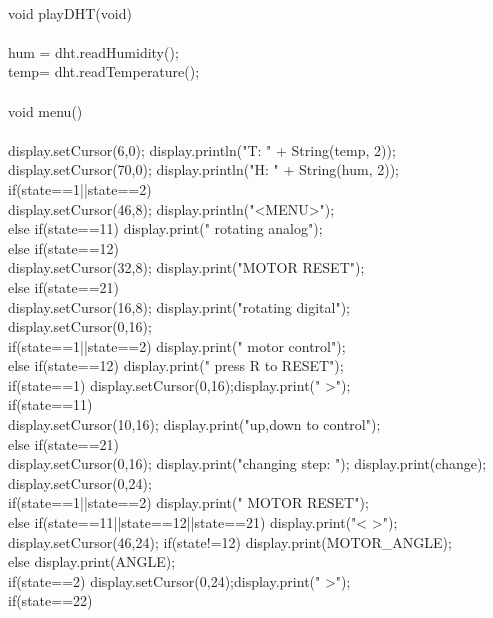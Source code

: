 \begin{verbbox}
{{}\\
void playDHT(void)\\
{\\
	hum = dht.readHumidity();\\
	temp= dht.readTemperature();\\
}\\
void menu()\\
{\\
	display.setCursor(6,0); display.println("T: " + String(temp, 2));\\
	display.setCursor(70,0); display.println("H: " + String(hum, 2));\\
	if(state==1||state==2) \\
	{display.setCursor(46,8); display.println("<MENU>");}\\
	else if(state==11) display.print("   rotating analog");\\
	else if(state==12)\\
	{display.setCursor(32,8); display.print("MOTOR RESET");}\\
	else if(state==21) \\
	{display.setCursor(16,8); display.print("rotating digital");}\\
	display.setCursor(0,16);\\
	if(state==1||state==2) display.print("   motor control");\\
	else if(state==12) display.print("   press R to RESET");\\
	if(state==1) {display.setCursor(0,16);display.print(" >");}\\
	if(state==11) \\
	{display.setCursor(10,16); display.print("up,down to control");}\\
	else if(state==21)\\
	{display.setCursor(0,16); display.print("changing step: "); display.print(change);}\\
	display.setCursor(0,24);\\
	if(state==1||state==2) display.print("   MOTOR RESET");\\
	else if(state==11||state==12||state==21) {display.print("<                   >"); \\
		display.setCursor(46,24); if(state!=12) display.print(MOTOR\_ANGLE);\\
		else display.print(ANGLE);}\\
	if(state==2) {display.setCursor(0,24);display.print(" >");}\\
	if(state==22)\\
}}
\end{verbbox}
